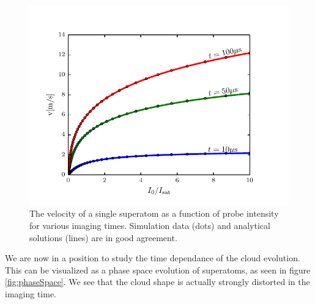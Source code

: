 \documentclass[12pt]{iopart}
\begin{document}
\begin{figure}
	\includegraphics{figure5.pdf}
\caption{The velocity of a single superatom as a function of probe intensity for various imaging times. Simulation data (dots) and analytical solutions (lines) are in good agreement.}  
\label{fig:oneAtomVel}
\end{figure}
\par We are now in a position to study the time dependance of the cloud evolution. This can be visualized as a phase space evolution of superatoms, as seen in figure \ref{fig:phaseSpace}. We see that the cloud shape is actually strongly distorted in the imaging time. 
\end{document}
